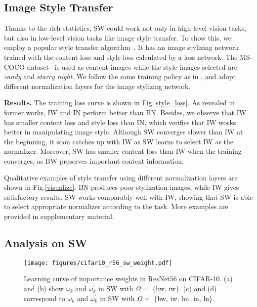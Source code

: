 \documentclass[10pt,twocolumn,letterpaper]{article}
\begin{document}
\subsection{Image Style Transfer}

Thanks to the rich statistics, SW could work not only in high-level vision tasks, but also in low-level vision tasks like image style transfer.
To show this, we employ a popular style transfer algorithm~\cite{johnson2016perceptual}.
It has an image stylizing network trained with the content loss and style loss calculated by a loss network.
The MS-COCO dataset~\cite{lin2014microsoft} is used as content images while the style images selected are \textit{candy} and \textit{starry night}.
We follow the same training policy as in \cite{johnson2016perceptual}, and adopt different normalization layers for the image stylizing network.

\noindent\textbf{Results.}
The training loss curve is shown in Fig.\ref{style_loss}.
As revealed in former works, IW and IN perform better than BN.
Besides, we observe that IW has smaller content loss and style loss than IN, which verifies that IW works better in manipulating image style.
Although SW converges slower than IW at the beginning, it soon catches up with IW as SW learns to select IW as the normalizer.
Moreover, SW has smaller content loss than IW when the training converges, as BW preserves important content information.

Qualitative examples of style transfer using different normalization layers are shown in Fig.\ref{visualize}.
BN produces poor stylization images, while IW gives satisfactory results.
SW works comparably well with IW, showing that SW is able to select appropriate normalizer according to the task.
More examples are provided in supplementary material.


\subsection{Analysis on SW}

\begin{figure*}[t!]
	\centering
	\texttt{[image: figures/cifar10\_r56\_sw\_weight.pdf]}
	\caption{Learning curve of importance weights in ResNet56 on CIFAR-10. (a) and (b) show \(\omega_k\) and \(\omega_{k}^{\prime}\) in SW with \(\Omega = \) \{bw, iw\}. (c) and (d) correspond to \(\omega_k\) and \(\omega_{k}^{\prime}\) in SW with \(\Omega = \) \{bw, iw, bn, in, ln\}.}
	\label{CIFAR10_weight}
\end{figure*}
\end{document}
